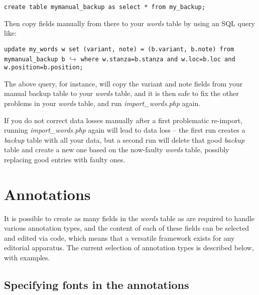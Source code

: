 \verb|create table mymanual_backup as select * from my_backup;|

Then copy fields manually from there to your \textit{words} table by using an SQL query like:

\verb|update my_words w set (variant, note) = (b.variant, b.note) from mymanual_backup b|
$\hookrightarrow$ \verb|where w.stanza=b.stanza and w.loc=b.loc and w.position=b.position;|

The above query, for instance, will copy the variant and note fields from your manual backup table to your \textit{words} table, and it is then safe to fix the other problems in your \textit{words} table, and run \textit{import_words.php} again.

If you do not correct data losses manually after a first problematic re-import, running \textit{import_words.php} again will lead to data loss -- the first run creates a \textit{backup} table with all your data, but a second run will delete that good \textit{backup} table and create a new one based on the now-faulty \textit{words} table, possibly replacing good entries with faulty ones. 


\section{Annotations}
\label{s:annotation}

It is possible to create as many fields in the \textit{words} table as are required to handle various annotation types, and the content of each of these fields can be selected and edited via code, which means that a versatile framework exists for any editorial apparatus.  The current selection of annotation types is described below, with examples.


\subsection{Specifying fonts in the annotations}

